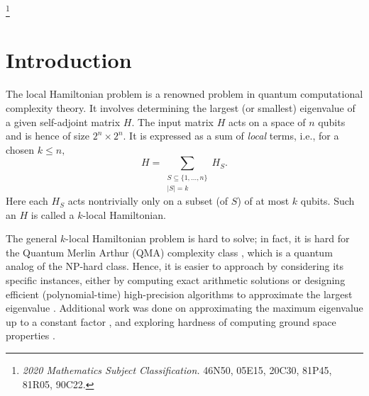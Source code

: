 \documentclass[12pt,dvipsnames,accepted=2016-08-18,a4paper,onecolumn]{quantumarticle}
\numberwithin{equation}{section}
\theoremstyle{definition}
\newcommand\blfootnote[1]{%
  \begingroup
  \renewcommand\thefootnote{}\footnote{#1}%
  \addtocounter{footnote}{-1}%
  \endgroup
}
\begin{document}
\maketitle
\blfootnote{\emph{2020 Mathematics Subject Classification.} 46N50, 05E15, 20C30, 81P45, 81R05, 90C22.}


\tableofcontents



\section{Introduction}

The local Hamiltonian problem
is a renowned problem in quantum computational complexity theory. It involves determining the largest (or smallest) eigenvalue of a given self-adjoint matrix $H.$ The input matrix $H$ acts on a space of $n$ qubits and is hence of size $2^n \times 2^n.$ It is expressed as a sum of \textit{local} terms, i.e., for a chosen $k\leq n,$
$$
H = \sum_{\substack{S \subseteq \{1,\ldots,n\} \\[.5mm] |S| = k}} H_S.
$$
Here each $H_S$ acts nontrivially only on a subset (of $S$) of at most $k$ qubits. Such an $H$ is called a $k$-local Hamiltonian.

The general $k$-local Hamiltonian problem is hard to solve; in fact, it is hard for the Quantum Merlin Arthur (QMA) complexity class \cite{KSV02,KKR06}, which is a quantum analog of the NP-hard class. Hence, it is easier to approach by considering its specific instances, either by computing exact arithmetic solutions \cite{LM62} or designing efficient (polynomial-time) high-precision algorithms to approximate the largest eigenvalue \cite{LVV15}. Additional work was done on approximating the maximum eigenvalue up to a constant factor \cite{GK12,BH13,BGKT19,HM17}, and exploring hardness of computing ground space properties \cite{GH}.
\end{document}
